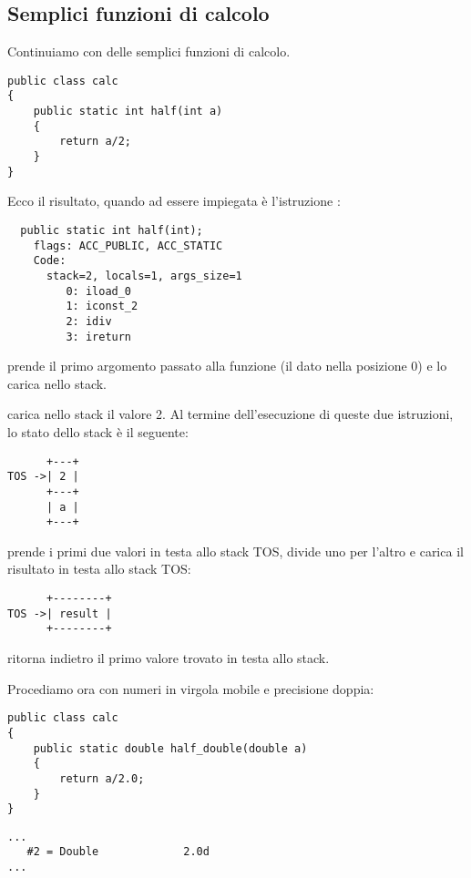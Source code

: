 \subsection{Semplici funzioni di calcolo}

Continuiamo con delle semplici funzioni di calcolo.

\begin{lstlisting}[style=customjava]
public class calc
{
	public static int half(int a)
	{
		return a/2;
	}
}
\end{lstlisting}

Ecco il risultato, quando ad essere impiegata è l'istruzione :


\begin{lstlisting}
  public static int half(int);
    flags: ACC_PUBLIC, ACC_STATIC
    Code:
      stack=2, locals=1, args_size=1
         0: iload_0       
         1: iconst_2      
         2: idiv          
         3: ireturn       
\end{lstlisting}
         
 prende il primo argomento passato alla funzione (il dato nella posizione 0) e lo carica nello stack.

 carica nello stack il valore 2.
Al termine dell'esecuzione di queste due istruzioni, lo stato dello stack è il seguente:


\begin{lstlisting}
      +---+
TOS ->| 2 |
      +---+
      | a |
      +---+
\end{lstlisting}

 prende i primi due valori in testa allo stack \ac{TOS}, divide uno per l'altro e carica il risultato 
in testa allo stack \ac{TOS}:


\begin{lstlisting}
      +--------+
TOS ->| result |
      +--------+
\end{lstlisting}

 ritorna indietro il primo valore trovato in testa allo stack.

Procediamo ora con numeri in virgola mobile e precisione doppia:


\begin{lstlisting}[style=customjava]
public class calc
{
	public static double half_double(double a)
	{
		return a/2.0;
	}
}
\end{lstlisting}

\begin{lstlisting}[caption=Constant pool]
...
   #2 = Double             2.0d
...
\end{lstlisting}

